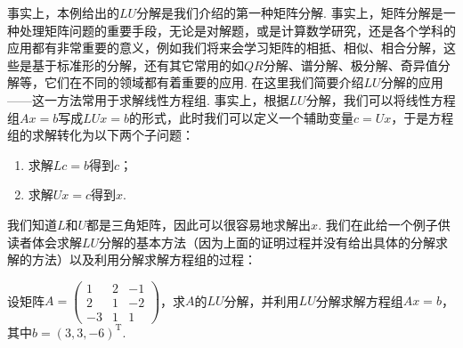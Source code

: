 事实上，本例给出的$LU$分解是我们介绍的第一种矩阵分解. 事实上，矩阵分解是一种处理矩阵问题的重要手段，无论是对解题，或是计算数学研究，还是各个学科的应用都有非常重要的意义，例如我们将来会学习矩阵的相抵、相似、相合分解，这些是基于标准形的分解，还有其它常用的如$QR$分解、谱分解、极分解、奇异值分解等，它们在不同的领域都有着重要的应用. 在这里我们简要介绍$LU$分解的应用——这一方法常用于求解线性方程组. 事实上，根据$LU$分解，我们可以将线性方程组$Ax=b$写成$LUx=b$的形式，此时我们可以定义一个辅助变量$c=Ux$，于是方程组的求解转化为以下两个子问题：
\begin{enumerate}
    \item 求解$Lc=b$得到$c$；
    \item 求解$Ux=c$得到$x$.
\end{enumerate}
我们知道$L$和$U$都是三角矩阵，因此可以很容易地求解出$x$. 我们在此给一个例子供读者体会求解$LU$分解的基本方法（因为上面的证明过程并没有给出具体的分解求解的方法）以及利用分解求解方程组的过程：
\begin{example}{}{}
    设矩阵$A=\begin{pmatrix}
            1 & 2 & -1 \\ 2 & 1 & -2 \\ -3 & 1 & 1
        \end{pmatrix}$，求$A$的$LU$分解，并利用$LU$分解求解方程组$Ax=b$，其中$b=(3,3,-6)^\mathrm{T}$.
\end{example}

